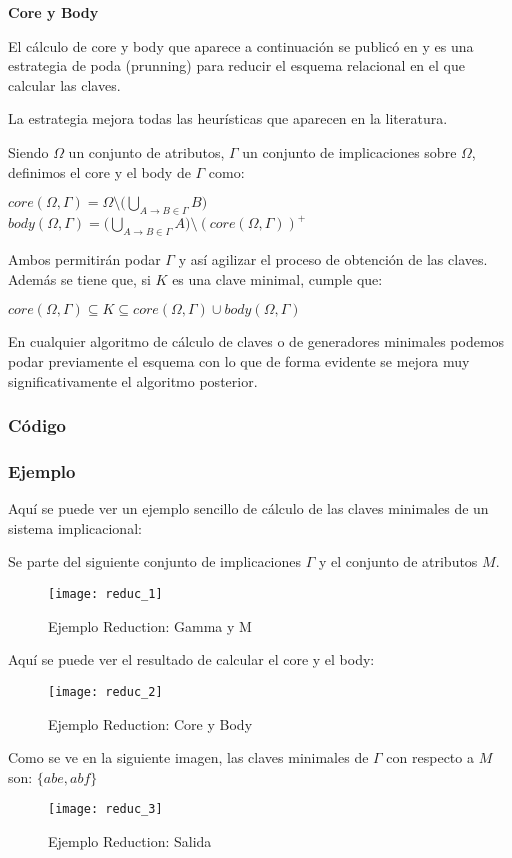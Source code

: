 \textbf{Core y Body}

El c\'alculo de core y body que aparece a continuaci\'on se public\'o en \cite{Reduction} y es una estrategia de poda (prunning) para reducir el esquema relacional en el que calcular las claves. 

La estrategia mejora todas las heur\'isticas que aparecen en la literatura. 

Siendo \(\Omega\) un conjunto de atributos, \(\Gamma\) un conjunto de implicaciones sobre \(\Omega\), definimos el core y el body de \(\Gamma\) como:
\begin{center}
    \(core(\Omega,\Gamma) = \Omega \setminus \Big(\bigcup_{A \to B \in \Gamma} B\Big) \ \ \ \ \)
    \(body(\Omega,\Gamma) = \Big(\bigcup_{A \to B \in \Gamma} A\Big) \setminus (core(\Omega,\Gamma))^+\)
\end{center}
Ambos permitir\'an podar \(\Gamma\) y as\'i agilizar el proceso de obtenci\'on de las claves. Adem\'as se tiene que, si \(K\) es una clave minimal, cumple que: 
\begin{center}
    \(core(\Omega,\Gamma) \subseteq K \subseteq core(\Omega,\Gamma) \cup body(\Omega,\Gamma)\)
\end{center}

En cualquier algoritmo de c\'alculo de claves o de generadores minimales podemos podar previamente el esquema con lo que de forma evidente se mejora muy significativamente el algoritmo posterior.

\newpage
\subsubsection{C\'odigo} 

\newpage


\newpage
\subsubsection{Ejemplo} 
Aqu\'i se puede ver un ejemplo sencillo de c\'alculo de las claves minimales de un sistema implicacional:

Se parte del siguiente conjunto de implicaciones \(\Gamma\) y el conjunto de atributos \(M\).
\begin{figure}[H]
    \centering
    \texttt{[image: reduc\_1]}
    \caption{Ejemplo Reduction: Gamma y M}
    \label{fig:reduc_1}
\end{figure}
Aqu\'i se puede ver el resultado de calcular el core y el body:
\begin{figure}[H]
    \centering
    \texttt{[image: reduc\_2]}
    \caption{Ejemplo Reduction: Core y Body}
    \label{fig:reduc_2}
\end{figure}
Como se ve en la siguiente imagen, las claves minimales de \(\Gamma\) con respecto a \(M\) son: \(\{abe,abf\}\)
\begin{figure}[H]
    \centering
    \texttt{[image: reduc\_3]}
    \caption{Ejemplo Reduction: Salida}
    \label{fig:reduc_3}
\end{figure}

